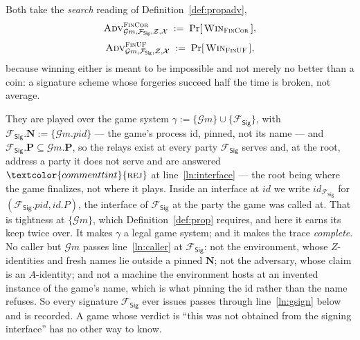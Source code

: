 \documentclass[10pt,oneside,openany]{book}
\newcommand{\Ps}{\mathbf{P}}
\newcommand{\PID}{\mathit{pid}}
\newcommand{\admits}{\mathbf{N}}
\newcommand{\Zenv}{\mathcal{Z}}
\newcommand{\advtg}{\op{Adv}}
\newcommand{\padv}[2]{\advtg^{#1}_{#2}}
\newcommand{\op}[1]{\textnormal{\textsc{#1}}}
\newcommand{\id}{id}
\newcommand{\atom}[1]{\textcolor{commenttint}{\op{#1}}}
\newcommand{\rej}{\atom{rej}}
\newcommand{\Gm}{\mathcal{G}m}
\newcommand{\Win}{\op{Win}}
\newcommand{\Fsig}{\mathcal{F}_{\mathsf{Sig}}}
\theoremstyle{accentdef}
\theoremstyle{accentplain}
\begin{document}
Both take the \emph{search} reading of Definition~\ref{def:propadv},
\[
  \begin{gathered}
  \padv{\op{FinCor}}{\Gm,\Fsig,\Zenv,\mathcal{X}} \;:=\; \Pr[\,\Win_{\op{FinCor}}\,] , \\[3pt]
  \padv{\op{FinUF}}{\Gm,\Fsig,\Zenv,\mathcal{X}} \;:=\; \Pr[\,\Win_{\op{FinUF}}\,] ,
  \end{gathered}
\]
because winning either is meant to be impossible and not merely no better than a coin: a signature
scheme whose forgeries succeed half the time is broken, not average.

They are played over the game system $\gamma := \{\Gm\} \cup \{\Fsig\}$, with
$\Fsig.\admits := \{\Gm.\PID\}$ --- the game's process id, pinned, not its name --- and
$\Fsig.\Ps \subseteq \Gm.\Ps$, so the relays exist at every party $\Fsig$ serves and, at the
root, address a party it does not serve and are answered $\rej$ at line~\ref{ln:interface} --- the
root being where the game finalizes, not where it plays. Inside an interface at $\id$ we write
$\id_{\Fsig}$ for $(\Fsig.\PID,\id.P)$, the interface of $\Fsig$ at the party the game was called at.
That is tightness at $\{\Gm\}$, which Definition~\ref{def:prop}
requires, and here it earns its keep twice over. It makes $\gamma$ a legal game system; and it makes
the trace \emph{complete}. No caller but $\Gm$ passes line~\ref{ln:caller} at $\Fsig$: not the
environment, whose $Z$-identities and fresh names lie outside a pinned $\admits$; not the adversary,
whose claim is an $A$-identity; and not a machine the environment hosts at an invented instance of the
game's name, which is what pinning the id rather than the name refuses. So every signature $\Fsig$
ever issues passes through line~\ref{ln:gsign} below and is recorded. A game whose verdict is
``this was not obtained from the signing interface'' has no other way to know.
\end{document}

